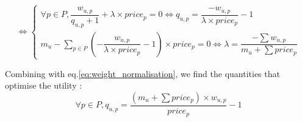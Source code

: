 \begin{equation*}
\Leftrightarrow 
\begin{cases}
\forall p\in P, \dfrac{w_{u,p}}{q_{u,p} + 1} + \lambda \times price_p = 0 \Leftrightarrow q_{u,p} = \dfrac{- w_{u, p}}{\lambda \times price_p} - 1 \\
m_u - \sum_{p\in P}(- \dfrac{w_{u, p}}{\lambda \times price_p} - 1)\times price_p = 0 \Leftrightarrow \lambda = \dfrac{- \sum w_{u,p}}{m_u + \sum price_p}
\end{cases}
\end{equation*}

Combining with eq.\eqref{eq:weight_normalisation}, we find the quantities that optimise the utility :
\begin{equation}
    \forall p\in P, q_{u,p} = \dfrac{(m_u + \sum price_p) \times w_{u, p}}{price_p} - 1
\end{equation}